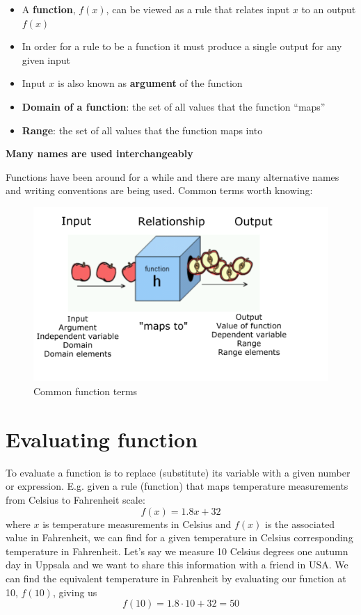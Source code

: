\documentclass[
]{book}
\providecommand{\tightlist}{%
  \setlength{\itemsep}{0pt}\setlength{\parskip}{0pt}}
\theoremstyle{definition}
\theoremstyle{definition}
\theoremstyle{definition}
\theoremstyle{remark}
\begin{document}
\begin{itemize}
\tightlist
\item
  A \textbf{function}, \(f(x)\), can be viewed as a rule that relates input \(x\) to an output \(f(x)\)
\item
  In order for a rule to be a function it must produce a single output for any given input
\item
  Input \(x\) is also known as \textbf{argument} of the function
\item
  \textbf{Domain of a function}: the set of all values that the function ``maps''
\item
  \textbf{Range}: the set of all values that the function maps into
\end{itemize}

\textbf{Many names are used interchangeably}

Functions have been around for a while and there are many alternative names and writing conventions are being used. Common terms worth knowing:

\begin{figure}

{\centering \includegraphics{figures/precourse/math-functions-terms} 

}

\caption{Common function terms}\label{fig:func-ters}
\end{figure}

\hypertarget{evaluating-function}{%
\section{Evaluating function}\label{evaluating-function}}

To evaluate a function is to replace (substitute) its variable with a given number or expression. E.g. given a rule (function) that maps temperature measurements from Celsius to Fahrenheit scale:
\[f(x) = 1.8x + 32\]
where \(x\) is temperature measurements in Celsius and \(f(x)\) is the associated value in Fahrenheit, we can find for a given temperature in Celsius corresponding temperature in Fahrenheit. Let's say we measure 10 Celsius degrees one autumn day in Uppsala and we want to share this information with a friend in USA. We can find the equivalent temperature in Fahrenheit by evaluating our function at 10, \(f(10)\), giving us \[f(10) = 1.8\cdot 10 + 32 = 50\]
\end{document}
